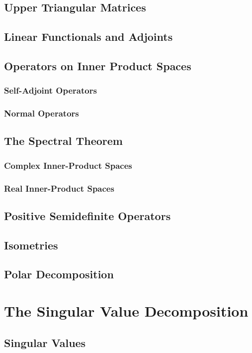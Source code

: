\documentclass[10pt]{article}
\begin{document}
\subsection{Upper Triangular Matrices}
\subsection{Linear Functionals and Adjoints}
\subsection{Operators on Inner Product Spaces}
\subsubsection{Self-Adjoint Operators}
\subsubsection{Normal Operators}
\subsection{The Spectral Theorem}
\subsubsection{Complex Inner-Product Spaces}
\subsubsection{Real Inner-Product Spaces}
\subsection{Positive Semidefinite Operators}
\subsection{Isometries}
\subsection{Polar Decomposition}

\section{The Singular Value Decomposition}
\subsection{Singular Values}
\end{document}
